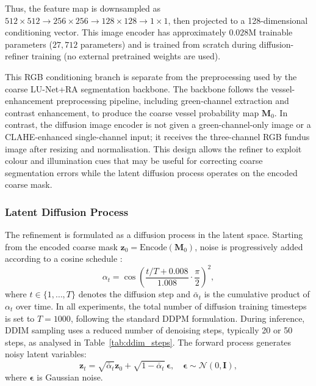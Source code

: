 \documentclass[journal,article,submit,pdftex,moreauthors]{Definitions/mdpi}
\begin{document}
Thus, the feature map is downsampled as $512\times512\rightarrow256\times256\rightarrow128\times128\rightarrow1\times1$, then projected to a 128-dimensional conditioning vector. This image encoder has approximately $0.028$M trainable parameters ($27{,}712$ parameters) and is trained from scratch during diffusion-refiner training (no external pretrained weights are used).

This RGB conditioning branch is separate from the preprocessing used by the coarse LU-Net+RA segmentation backbone. The backbone follows the vessel-enhancement preprocessing pipeline, including green-channel extraction and contrast enhancement, to produce the coarse vessel probability map $\mathbf{M}_0$. In contrast, the diffusion image encoder is not given a green-channel-only image or a CLAHE-enhanced single-channel input; it receives the three-channel RGB fundus image after resizing and normalisation. This design allows the refiner to exploit colour and illumination cues that may be useful for correcting coarse segmentation errors while the latent diffusion process operates on the encoded coarse mask.
\subsubsection{Latent Diffusion Process}

The refinement is formulated as a diffusion process in the latent space. Starting from the encoded coarse mask $\mathbf{z}_0=\mathrm{Encode}(\mathbf{M}_0)$, noise is progressively added according to a cosine schedule \cite{Nichol2021}:
\begin{equation}
\alpha_t=\cos\!\left(\frac{t/T+0.008}{1.008}\cdot\frac{\pi}{2}\right)^2,
\end{equation}
where $t\in\{1,\dots,T\}$ denotes the diffusion step and $\bar{\alpha}_t$ is the cumulative product of $\alpha_t$ over time. In all experiments, the total number of diffusion training timesteps is set to $T=1000$, following the standard DDPM formulation. During inference, DDIM sampling uses a reduced number of denoising steps, typically 20 or 50 steps, as analysed in Table~\ref{tab:ddim_steps}. The forward process generates noisy latent variables:
\begin{equation}
\mathbf{z}_t=\sqrt{\bar{\alpha}_t}\mathbf{z}_0+\sqrt{1-\bar{\alpha}_t}\,\boldsymbol{\epsilon}, 
\quad \boldsymbol{\epsilon}\sim\mathcal{N}(0,\mathbf{I}),
\end{equation}
where $\boldsymbol{\epsilon}$ is Gaussian noise.
\end{document}
